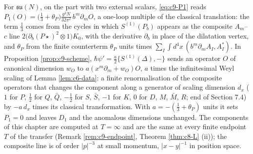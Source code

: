 \begin{remark}
For $\mathfrak{su}(N)$, on the part with two external scalars, \eqref{eq:c9-P1} reads $P_1(O)=\big(\tfrac13+\theta_P\big)\frac{g^2N}{32\pi^2}\,b^m\partial_mO$, a one-loop multiple of the classical translation: the term $\tfrac13$ comes from the cycles in which $S^{(1)}(P_b)$ appears as the composite $A_m$--$c$ line $2\big(\partial_b(P\star)^2\otimes1\big)K_0$, with the derivative $\partial_b$ in place of the dilatation vertex, and $\theta_P$ from the finite counterterm $\theta_P$ units times $\sum_I\int d^4x\,(b^m\partial_mA_I,A^*_I)$. In Proposition \ref{prop:c9-scheme}, $\hbar\psi'=\tfrac a2\{S^{(1)}(\Delta),-\}$ sends an operator $O$ of canonical dimension $w_O$ to $a(x^m\partial_m+w_O)O$, $a$ times the infinitesimal Weyl scaling of Lemma \ref{lem:c6-data}: a finite renormalisation of the composite operators that changes the component along a generator of scaling dimension $d_x$ ($1$ for $P$, $\tfrac12$ for $Q$, $\bar Q$, $-\tfrac12$ for $S$, $\bar S$, $-1$ for $K$, $0$ for $D$, $M$, $\bar M$, $R$; end of Section 7.4) by $-a\,d_x$ times its classical transformation. With $a=-(\tfrac13+\theta_P)$ units it sets $P_1=0$ and leaves $D_1$ and the anomalous dimensions unchanged. The components of this chapter are computed at $T=\infty$ and are the same at every finite endpoint $T$ of the transfer (Remark \ref{rem:c9-endpoint}, Theorem \ref{thm:c8-L} (ii)); the composite line is of order $|p|^{-3}$ at small momentum, $|x-y|^{-1}$ in position space.
\end{remark}
